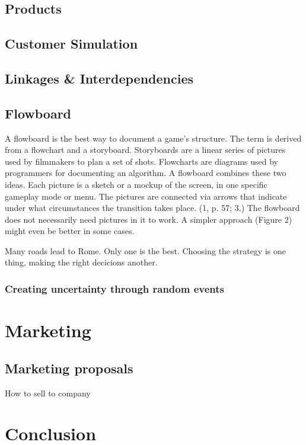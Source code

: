 \documentclass[11pt,titlepage,oneside,openany]{book}
\begin{document}
\section{Products}
\label{sec:products}

\section{Customer Simulation}
\label{sec:customsim}

\section{Linkages \& Interdependencies}
\label{sec:link}

\section{Flowboard}

A flowboard is the best way to document a game’s structure. The term is derived
from a flowchart and a storyboard. Storyboards are a linear series of pictures
used by filmmakers to plan a set of shots. Flowcharts are diagrams used
by programmers for documenting an algorithm. A flowboard combines these
two ideas. Each picture is a sketch or a mockup of the screen, in one specific
gameplay mode or menu. The pictures are connected via arrows that indicate
under what circumstances the transition takes place. (1, p. 57; 3.) The flowboard
does not necessarily need pictures in it to work. A simpler approach (Figure
2) might even be better in some cases.

Many roads lead to Rome. Only one is the best. Choosing the strategy is one thing, making the right decicions another. 

\subsection{Creating uncertainty through random events}

\chapter{Marketing}
\label{cha:exp}

\section{Marketing proposals}
\label{sec:setting}
How to sell to company


\chapter{Conclusion}
\label{cha:conclusion}
\end{document}
